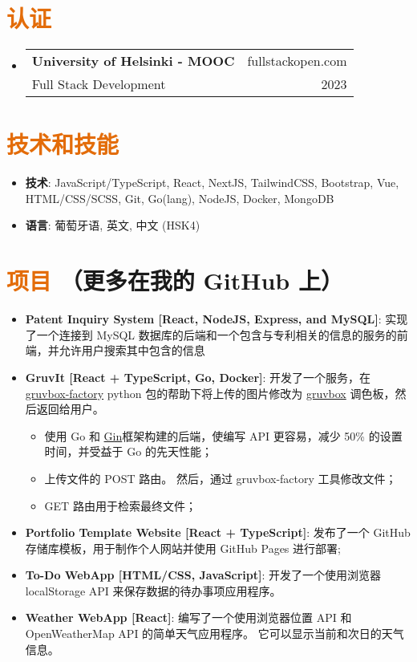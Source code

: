 \documentclass[a4paper, 20pt]{article}
\makeatletter
\newcommand{\resumeItem}[2]{
  \item\small{
    \textbf{#1}{: #2 \vspace{-2pt}}
  }
}
\newcommand{\resumeSubheading}[4]{
  \vspace{-1pt}\item
    \begin{tabular*}{0.97\textwidth}{l@{\extracolsep{\fill}}r}
      \textbf{#1} & #2 \\
      #3 & #4 \\
    \end{tabular*}\vspace{-5pt}
}
\newcommand{\resumeSubItem}[2]{\resumeItem{#1}{#2}\vspace{-3pt}}
\newcommand{\resumeSubHeadingListStart}{\begin{itemize}[leftmargin=*]}
\newcommand{\resumeSubHeadingListEnd}{\end{itemize}}
\makeatother
\begin{document}
\begin{CJK*}{UTF8}{gbsn}
\vspace{5pt}
\section{\textcolor[HTML]{E36C09}{\textbf{认证}}}
\resumeSubHeadingListStart{}
\resumeSubheading{University of Helsinki - MOOC}{fullstackopen.com}
{Full Stack Development}{2023}
\resumeSubHeadingListEnd{}

\vspace{5pt}
\section{\textcolor[HTML]{E36C09}{\textbf{技术和技能}}}
	\resumeSubHeadingListStart{}
	  \resumeSubItem{技术}{\quad JavaScript/TypeScript, React, NextJS, TailwindCSS, Bootstrap, Vue, HTML/CSS/SCSS, Git, Go(lang), NodeJS, Docker, MongoDB}
	  \resumeSubItem{语言}{\quad 葡萄牙语, 英文, 中文 (HSK4)}
  \resumeSubHeadingListEnd{}


\vspace{5pt}
\section{\textcolor[HTML]{E36C09}{\textbf{项目}} \tiny{（更多在我的 GitHub 上）}}
  \resumeSubHeadingListStart{}
    \resumeSubItem{Patent Inquiry System [React, NodeJS, Express, and MySQL]}
      {实现了一个连接到 MySQL 数据库的后端和一个包含与专利相关的信息的服务的前端，并允许用户搜索其中包含的信息}
      \vspace{2pt}
      \resumeSubItem{GruvIt [React + TypeScript, Go, Docker]}
      {开发了一个服务，在 \href{https://github.com/paulopacitti/gruvbox-factory}{gruvbox-factory} python 包的帮助下将上传的图片修改为 \href{https://github.com/morhetz/gruvbox}{gruvbox} 调色板，然后返回给用户。}
      \begin{itemize}
        \item{使用 Go 和 \href{https://github.com/gin-gonic/gin}{Gin}框架构建的后端，使编写 API 更容易，减少 50\% 的设置时间，并受益于 Go 的先天性能；}
        \item{上传文件的 POST 路由。 然后，通过 gruvbox-factory 工具修改文件；}
        \item{GET 路由用于检索最终文件；}
      \end{itemize}
      \vspace{2pt}
    \resumeSubItem{Portfolio Template Website [React + TypeScript]}
      {发布了一个 GitHub 存储库模板，用于制作个人网站并使用 GitHub Pages 进行部署;}
      \vspace{2pt}
    \resumeSubItem{To-Do WebApp [HTML/CSS, JavaScript]}
      {开发了一个使用浏览器 localStorage API 来保存数据的待办事项应用程序。}
      \vspace{2pt}
    \resumeSubItem{Weather WebApp [React]}
      {编写了一个使用浏览器位置 API 和 OpenWeatherMap API 的简单天气应用程序。 它可以显示当前和次日的天气信息。}
      \vspace{2pt}
  \resumeSubHeadingListEnd{}

\clearpage\end{CJK*}
\end{document}
